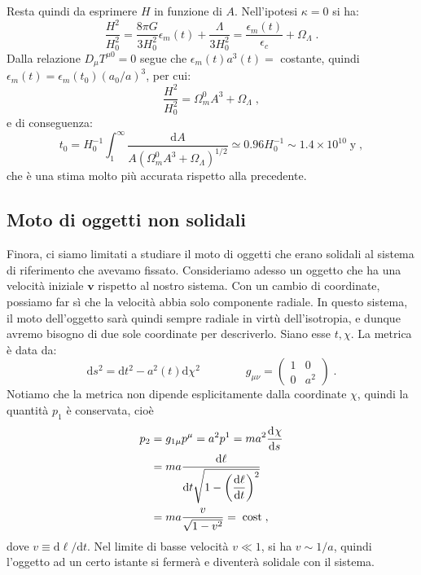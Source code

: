 \documentclass[12pt,a4paper]{report}
\theoremstyle{definition}
\newcommand{\dev}[3][]{\frac{\mathrm{d}^{#1} #2}{\mathrm{d} #3^{#1}}}
\newcommand{\diff}[1][]{\mathrm{d}#1}
\begin{document}
Resta quindi da esprimere $H$ in funzione di $A$. Nell'ipotesi $\kappa=0$ si ha:
$$
\frac{H^2}{H_0^2}=\frac{8\pi G}{3H_0^2}\epsilon_m(t)+\frac{\Lambda}{3H_0^2}=\frac{\epsilon_m(t)}{\epsilon_c}+\Omega_{\Lambda}\;.
$$
Dalla relazione $D_{\mu}T^{\mu 0}=0$ segue che $\epsilon_m(t)a^3(t)=$ costante, quindi $\epsilon_m(t)=\epsilon_m(t_0)(a_0/a)^3$, per cui:
\begin{equation}
\frac{H^2}{H_0^2}=\Omega_m^0A^3+\Omega_{\Lambda}\;,
\end{equation}
e di conseguenza:
\begin{equation}
t_0=H_0^{-1}\int_1^{\infty}\frac{\diff{A}}{A(\Omega_m^0A^3+\Omega_{\Lambda})^{1/2}}\simeq 0.96H_0^{-1}\sim 1.4\times 10^{10}\;\mbox{y}\;,
\end{equation}
che è una stima molto più accurata rispetto alla precedente.
\subsection{Moto di oggetti non solidali}
Finora, ci siamo limitati a studiare il moto di oggetti che erano solidali al sistema di riferimento che avevamo fissato. Consideriamo adesso un oggetto che ha una velocità iniziale $\mathbf{v}$ rispetto al nostro sistema. Con un cambio di coordinate, possiamo far sì che la velocità abbia solo componente radiale. In questo sistema, il moto dell'oggetto sarà quindi sempre radiale in virtù dell'isotropia, e dunque avremo bisogno di due sole coordinate per descriverlo. Siano esse $t,\chi$. La metrica è data da:
\begin{equation}
\diff{s}^2=\diff{t}^2-a^2(t)\diff{\chi}^2\qquad\qquad g_{\mu\nu}=\left(\begin{matrix}
1 & 0 \\
0 & a^2
\end{matrix}\right)\;.
\end{equation}
Notiamo che la metrica non dipende esplicitamente dalla coordinate $\chi$, quindi la quantità $p_1$ è conservata, cioè
\begin{align}
p_2 &=g_{1\mu}p^{\mu}=a^2p^1=ma^2\dev{\chi}{s} \notag \\
&= ma\frac{\diff{\ell}}{\diff{t}\sqrt{1-\left(\dfrac{\diff{\ell}}{\diff{t}}\right)^2}} \notag \\
&= ma\frac{v}{\sqrt{1-v^2}}=\;\mbox{cost}\;,
\end{align}
dove $v\equiv \diff{\ell}/\diff{t}$. Nel limite di basse velocità $v\ll 1$, si ha $v\sim 1/a$, quindi l'oggetto ad un certo istante si fermerà e diventerà solidale con il sistema.
\end{document}
